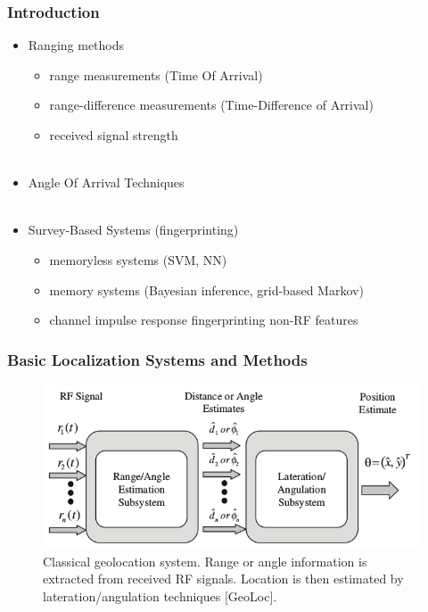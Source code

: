 \documentclass [t] {beamer} %
\begin{document}
\begin{frame} %
\frametitle{Introduction}
\phantom{m}
\begin{itemize}
\item
Ranging methods
\begin{itemize}
\item
range measurements (Time Of Arrival)
\item
range-difference measurements (Time-Difference of Arrival)
\item
received signal strength
\\~\\
\end{itemize}

\item
Angle Of Arrival Techniques
\\~\\
\item
Survey-Based Systems (fingerprinting)
\begin{itemize}
\item
memoryless systems (SVM, NN)
\item
memory systems (Bayesian inference, grid-based Markov)
\item
channel impulse response fingerprinting
non-RF features
\end{itemize}
\end{itemize}
\end{frame}

\begin{frame} %
\frametitle{Basic Localization Systems and Methods}
\begin{figure}[h]
\includegraphics[width=1.0\textwidth]{../figures/localization_example.png}
\caption{Classical geolocation system. Range or angle information is extracted from received RF signals. Location is then estimated by lateration/angulation techniques [GeoLoc].}
\label{fig:2step}
\end{figure}
\end{frame}
\end{document}
